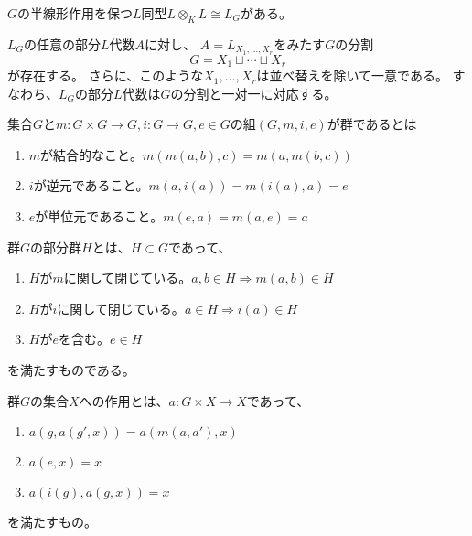 \begin{proposition}\label{ext-self}
    $G$の半線形作用を保つ$L$同型$L\otimes_KL\cong L_G$がある。
\end{proposition}

\begin{proposition}\label{subalgebra-decomp}
    $L_G$の任意の部分$L$代数$A$に対し、
    $A=L_{X_1,\ldots,X_r}$をみたす$G$の分割$$G=X_1\sqcup \cdots\sqcup X_r$$が存在する。
    さらに、このような$X_1,\ldots,X_r$は並べ替えを除いて一意である。
    すなわち、$L_G$の部分$L$代数は$G$の分割と一対一に対応する。
\end{proposition}

\begin{definition}\label{group-def}
    集合$G$と$m:G\times G\to G, i:G\to G, e\in G$の組$(G,m,i,e)$が群であるとは
    \begin{enumerate}
        \item $m$が結合的なこと。$m(m(a,b),c)=m(a,m(b,c))$
        \item $i$が逆元であること。$m(a,i(a))=m(i(a),a)=e$
        \item $e$が単位元であること。$m(e,a)=m(a,e)=a$
    \end{enumerate}
\end{definition}

\begin{definition}\label{subgroup-def}
    群$G$の部分群$H$とは、$H\subset G$であって、
    \begin{enumerate}
        \item $H$が$m$に関して閉じている。$a,b\in H\Rightarrow m(a,b)\in H$
        \item $H$が$i$に関して閉じている。$a\in H\Rightarrow i(a)\in H$
        \item $H$が$e$を含む。$e\in H$
    \end{enumerate}
    を満たすものである。
\end{definition}

\begin{definition}\label{action-def}
    群$G$の集合$X$への作用とは、$a:G\times X\to X$であって、
    \begin{enumerate}
        \item $a(g,a(g',x))=a(m(a,a'),x)$
        \item $a(e,x)=x$
        \item $a(i(g),a(g,x))=x$
    \end{enumerate}
    を満たすもの。
\end{definition}

